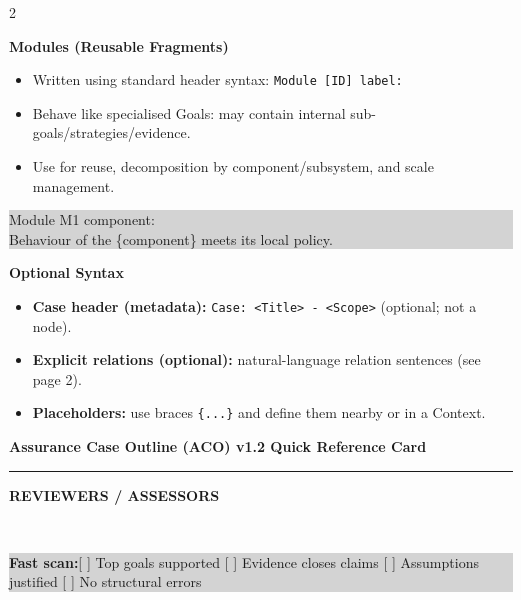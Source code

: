 \documentclass[10pt,letterpaper]{article}
\newcommand{\CardTitle}[1]{%
  \begin{center}
    {\Large\bfseries #1}\\[-2pt]
    \rule{0.92\linewidth}{0.6pt}
  \end{center}
}
\newcommand{\BannerBox}[1]{%
  \noindent\colorbox{Banner}{%
    \parbox{\linewidth}{\color{white}\bfseries\small\hspace{6pt}#1\hspace{6pt}}%
  }\\[10pt]
}
\newcommand{\Sec}[1]{%
  \vspace{5pt}%
  \noindent{\color{RuleGray}\rule{\linewidth}{0.35pt}}\par
  \vspace{2pt}%
  {\bfseries #1}\par
  \vspace{2pt}%
}
\newcommand{\Example}[1]{%
  \vspace{1pt}%
  \noindent\colorbox{LightGray}{%
    \parbox{\linewidth}{\ttfamily\footnotesize\raggedright
#1
    }%
  }%
  \vspace{2pt}%
}
\begin{document}
\begin{multicols*}{2}
\Sec{Modules (Reusable Fragments)}
\begin{itemize}
  \item Written using standard header syntax: \texttt{Module [ID] label:}
  \item Behave like specialised Goals: may contain internal sub-goals/strategies/evidence.
  \item Use for reuse, decomposition by component/subsystem, and scale management.
\end{itemize}
\Example{Module M1 component:\\
\hspace*{1.5em}Behaviour of the \string\{component\string\} meets its local policy.}

\Sec{Optional Syntax}
\begin{itemize}
  \item \textbf{Case header (metadata):} \texttt{Case: <Title> - <Scope>} (optional; not a node).
  \item \textbf{Explicit relations (optional):} natural-language relation sentences (see page 2).
  \item \textbf{Placeholders:} use braces \texttt{\string\{...\string\}} and define them nearby or in a Context.
\end{itemize}

\end{multicols*}

\clearpage

\CardTitle{Assurance Case Outline (ACO) v1.2 Quick Reference Card}
\BannerBox{REVIEWERS / ASSESSORS}

\noindent\colorbox{LightGray}{%
\parbox{\linewidth}{\small
\textbf{Fast scan:}\hspace{0.6em}[ ] Top goals supported \hspace{0.6em}\hspace{0.6em}[ ] Evidence closes claims \hspace{0.6em}\hspace{0.6em}[ ] Assumptions justified \hspace{0.6em}\hspace{0.6em}[ ] No structural errors
}}\\[6pt]
\end{document}
